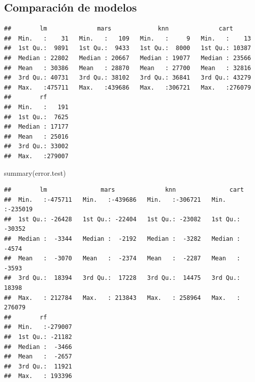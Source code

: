\documentclass[
]{article}
\newenvironment{Shaded}{\begin{snugshade}}{\end{snugshade}}
\newcommand{\AttributeTok}[1]{\textcolor[rgb]{0.77,0.63,0.00}{#1}}
\newcommand{\FunctionTok}[1]{\textcolor[rgb]{0.00,0.00,0.00}{#1}}
\newcommand{\NormalTok}[1]{#1}
\newcommand{\OtherTok}[1]{\textcolor[rgb]{0.56,0.35,0.01}{#1}}
\newcommand{\SpecialCharTok}[1]{\textcolor[rgb]{0.00,0.00,0.00}{#1}}
\begin{document}
\hypertarget{comparaciuxf3n-de-modelos}{%
\subsection{Comparación de modelos}\label{comparaciuxf3n-de-modelos}}

\begin{Shaded}
\end{Shaded}

\begin{verbatim}
##        lm              mars             knn              cart       
##  Min.   :    31   Min.   :   109   Min.   :     9   Min.   :    13  
##  1st Qu.:  9891   1st Qu.:  9433   1st Qu.:  8000   1st Qu.: 10387  
##  Median : 22802   Median : 20667   Median : 19077   Median : 23566  
##  Mean   : 30386   Mean   : 28870   Mean   : 27700   Mean   : 32816  
##  3rd Qu.: 40731   3rd Qu.: 38102   3rd Qu.: 36841   3rd Qu.: 43279  
##  Max.   :475711   Max.   :439686   Max.   :306721   Max.   :276079  
##        rf        
##  Min.   :   191  
##  1st Qu.:  7625  
##  Median : 17177  
##  Mean   : 25016  
##  3rd Qu.: 33002  
##  Max.   :279007
\end{verbatim}

\begin{Shaded}
\begin{Highlighting}[]
\FunctionTok{summary}\NormalTok{(error.test)}
\end{Highlighting}
\end{Shaded}

\begin{verbatim}
##        lm               mars              knn               cart        
##  Min.   :-475711   Min.   :-439686   Min.   :-306721   Min.   :-235019  
##  1st Qu.: -26428   1st Qu.: -22404   1st Qu.: -23082   1st Qu.: -30352  
##  Median :  -3344   Median :  -2192   Median :  -3282   Median :  -4574  
##  Mean   :  -3070   Mean   :  -2374   Mean   :  -2287   Mean   :  -3593  
##  3rd Qu.:  18394   3rd Qu.:  17228   3rd Qu.:  14475   3rd Qu.:  18398  
##  Max.   : 212784   Max.   : 213843   Max.   : 258964   Max.   : 276079  
##        rf         
##  Min.   :-279007  
##  1st Qu.: -21182  
##  Median :  -3466  
##  Mean   :  -2657  
##  3rd Qu.:  11921  
##  Max.   : 193396
\end{verbatim}
\end{document}
